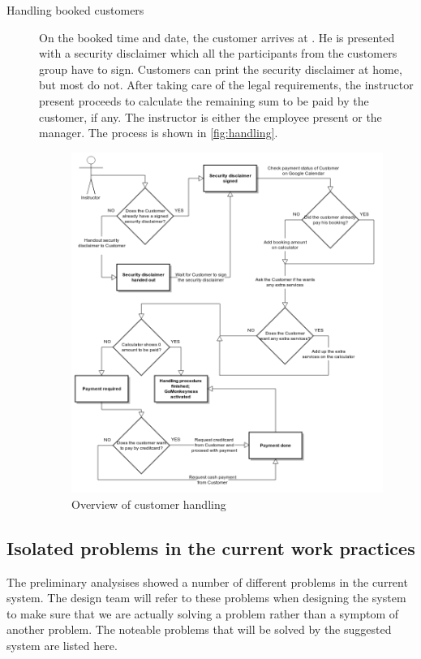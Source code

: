 \begin{description}
\item[Handling booked customers]
On the booked time and date, the customer arrives at \gomonkey{}. He is presented with a security disclaimer
which all the participants from the customers group have to sign. Customers can print the security disclaimer 
at home, but most do not. After taking care of the legal requirements, the instructor present proceeds to
calculate the remaining sum to be paid by the customer, if any. The instructor is either the employee present
or the manager. The process is shown in \autoref{fig:handling}. 

\begin{figure}[htbp]
    \centering
        \includegraphics[width=\textwidth]{figures/handling.png}
            \caption{Overview of customer handling}
        \label{fig:handling}
\end{figure}
\end{description}


\subsection{Isolated problems in the current work practices}
The preliminary analysises showed a number of different problems in the current system. 
The design team will refer to these problems when designing the system
to make sure that we are actually solving a problem rather than a symptom
of another problem. The noteable problems that will be solved by the suggested system are listed here.

